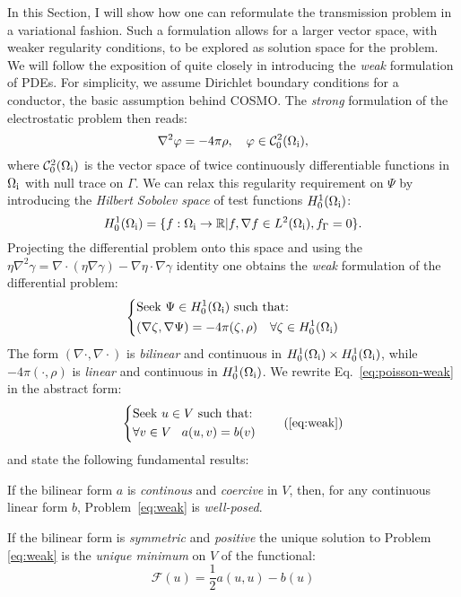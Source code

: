 In this Section, I will show how one can reformulate the transmission problem
in a variational fashion.
Such a formulation allows for a larger vector space, with weaker regularity
conditions, to be explored as solution space for the problem.
We will follow the exposition of \citeauthor{Ern2004-oo} quite closely
in introducing the \emph{weak} formulation of \glspl{PDE}.
For simplicity, we assume Dirichlet boundary conditions for a conductor,
\ie the basic assumption behind \acrshort{COSMO}.
The \emph{strong} formulation of the electrostatic problem then reads:
\begin{equation}\label{eq:poisson-cosmo}
  \nabla^2\varphi = -4\pi\rho,
  \quad \varphi \in \mathcal{C}^2_0(\Omega_\mathrm{i}),
\end{equation}
where $\mathcal{C}^2_0(\Omega_\mathrm{i})$ is the vector space of twice
continuously differentiable functions in $\Omega_\mathrm{i}$ with null trace on
$\Gamma$.
We can relax this regularity requirement on $\Psi$ by introducing the
\emph{Hilbert Sobolev space} of test functions $H_0^1(\Omega_\mathrm{i})$:
\begin{equation}
  H_0^1(\Omega_\mathrm{i}) = \lbrace
  f : \Omega_\mathrm{i} \rightarrow \mathbb{R}
  | f, \nabla f \in L^2(\Omega_\mathrm{i}), f_\Gamma = 0
  \rbrace.
\end{equation}
Projecting the differential problem onto this space and using the
$\eta\nabla^2\gamma = \nabla\cdot(\eta\nabla\gamma) - \nabla\eta\cdot\nabla\gamma$ identity
one obtains the \emph{weak} formulation of the differential problem:
\begin{equation}\label{eq:poisson-weak}
  \left\{
  \begin{aligned}
    &\text{Seek $\Psi \in H_0^1(\Omega_\mathrm{i})$ such that:}\\
    &(\nabla\zeta, \nabla\Psi) =
    -4\pi(\zeta, \rho) \quad
    \forall \zeta\in H_0^1(\Omega_\mathrm{i})
  \end{aligned}
  \right.
\end{equation}
The form $(\nabla\cdot, \nabla\cdot)$ is \emph{bilinear} and continuous
in $H_0^1(\Omega_\mathrm{i})\times H_0^1(\Omega_\mathrm{i})$, while $-4\pi(\cdot, \rho)$ is
\emph{linear} and continuous in $H_0^1(\Omega_\mathrm{i})$.
We rewrite Eq.~\eqref{eq:poisson-weak} in the abstract form:
\begin{equation}
  \left\{
  \begin{aligned}
    &\text{Seek $u \in V$ such that:}\\
    &\forall v \in V \,\,\,\,\,
    a(u, v) = b(v)
  \end{aligned}
  \right.
  \tag{\ref{eq:weak}}
\end{equation}
and state the following fundamental results:
\begin{lemma}
  If the bilinear form $a$ is \emph{continous} and \emph{coercive}
  in $V$, then, for any continuous linear form $b$, Problem~\eqref{eq:weak} is
  \emph{well-posed}.
\end{lemma}
\begin{corollary}
  If the bilinear form is \emph{symmetric} and \emph{positive}
  the unique solution to Problem \eqref{eq:weak} is
  the \emph{unique minimum} on $V$ of the functional:
  \[
  \mathcal{F}(u) = \frac{1}{2}a(u, u) - b(u)
  \]
\end{corollary}

